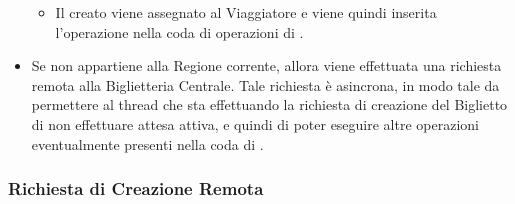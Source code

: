 \begin{itemize}
\begin {itemize}
\begin{itemize}
\begin{verbatim}
						\end{verbatim}
						\item $i$ viene incrementato di $Max\_Length$.
					\end{itemize} 
			\item Il  creato viene assegnato al Viaggiatore e viene quindi inserita l'operazione  nella coda di operazioni di .
			\end {itemize} 
		\item Se  non appartiene alla Regione corrente, allora viene effettuata una richiesta remota alla Biglietteria Centrale. Tale richiesta è asincrona, in modo tale da permettere al thread che sta effettuando la richiesta di creazione del Biglietto di non effettuare attesa attiva, e quindi di poter eseguire altre operazioni eventualmente presenti nella coda di .
	\end{itemize} 


	\subsubsection {Richiesta di Creazione Remota}
	
